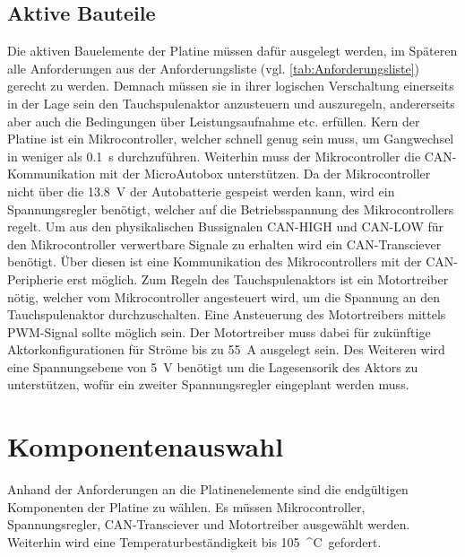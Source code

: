 \subsection{Aktive Bauteile}
Die aktiven Bauelemente der Platine müssen dafür ausgelegt werden, im Späteren alle Anforderungen aus der Anforderungsliste (vgl. \autoref{tab:Anforderungsliste}) gerecht zu werden. Demnach müssen sie in ihrer logischen Verschaltung einerseits in der Lage sein den Tauchspulenaktor anzusteuern und auszuregeln, andererseits aber auch die Bedingungen über Leistungsaufnahme etc. erfüllen. Kern der Platine ist ein Mikrocontroller, welcher schnell genug sein muss, um Gangwechsel in weniger als \SI{0,1}{s} durchzuführen. Weiterhin muss der Mikrocontroller die CAN-Kommunikation mit der MicroAutobox unterstützen. Da der Mikrocontroller nicht über die \SI{13,8}{V} der Autobatterie gespeist werden kann, wird ein Spannungsregler benötigt, welcher auf die Betriebsspannung des Mikrocontrollers regelt. Um aus den physikalischen Bussignalen CAN-HIGH und CAN-LOW für den Mikrocontroller verwertbare Signale zu erhalten wird ein CAN-Transciever benötigt. Über diesen ist eine Kommunikation des Mikrocontrollers mit der CAN-Peripherie erst möglich. Zum Regeln des Tauchspulenaktors ist ein Motortreiber nötig, welcher vom Mikrocontroller angesteuert wird, um die Spannung an den Tauchspulenaktor durchzuschalten. Eine Ansteuerung des Motortreibers mittels PWM-Signal sollte möglich sein. Der Motortreiber muss dabei für zukünftige Aktorkonfigurationen für Ströme bis zu \SI{55}{A} ausgelegt sein. Des Weiteren wird eine Spannungsebene von \SI{5}{V} benötigt um die Lagesensorik des Aktors zu unterstützen, wofür ein zweiter Spannungsregler eingeplant werden muss.
\newpage
\section{Komponentenauswahl}
Anhand der Anforderungen an die Platinenelemente sind die endgültigen Komponenten der Platine zu wählen. Es müssen Mikrocontroller, Spannungsregler, CAN-Transciever und Motortreiber ausgewählt werden. Weiterhin wird eine Temperaturbeständigkeit bis \SI{105}{^\circ C} gefordert.

